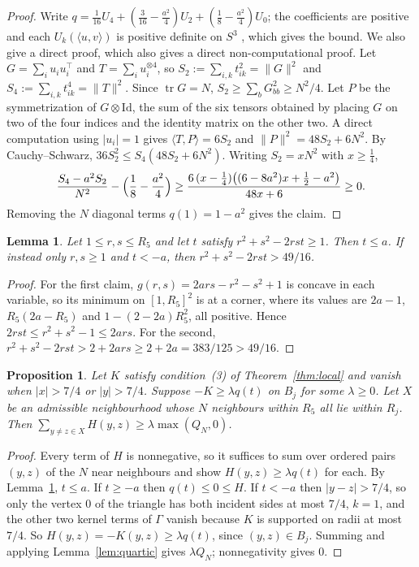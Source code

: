 \documentclass[11pt]{amsart}
\numberwithin{equation}{section}
\newtheorem{lemma}[theorem]{Lemma}
\newtheorem{proposition}[theorem]{Proposition}
\theoremstyle{remark}
\newcommand{\ip}[2]{\langle #1,#2\rangle}
\newcommand{\Gam}{\Gamma}
\begin{document}
\begin{proof}
Write $q=\frac1{16}U_4+(\frac3{16}-\frac{a^2}4)U_2+(\frac18-\frac{a^2}4)U_0$; the coefficients are positive and each $U_k(\ip uv)$ is positive definite on $S^3$ \cite{Schoenberg}, which gives the bound. We also give a direct proof, which also gives a direct non-computational proof. Let $G=\sum_iu_iu_i^\top$ and $T=\sum_iu_i^{\otimes4}$, so $S_2:=\sum_{i,k}t_{ik}^2=\|G\|^2$ and $S_4:=\sum_{i,k}t_{ik}^4=\|T\|^2$. Since $\operatorname{tr}G=N$, $S_2\ge\sum_bG_{bb}^2\ge N^2/4$. Let $P$ be the symmetrization of $G\otimes\mathrm{Id}$, the sum of the six tensors obtained by placing $G$ on two of the four indices and the identity matrix on the other two. A direct computation using $|u_i|=1$ gives $\ip TP=6S_2$ and $\|P\|^2=48S_2+6N^2$. By Cauchy--Schwarz, $36S_2^2\le S_4(48S_2+6N^2)$. Writing $S_2=xN^2$ with $x\ge\frac14$,
\[
\frac{S_4-a^2S_2}{N^2}-\Bigl(\frac18-\frac{a^2}4\Bigr)\ge\frac{6\,(x-\frac14)\bigl((6-8a^2)x+\frac12-a^2\bigr)}{48x+6}\ge0.
\]
Removing the $N$ diagonal terms $q(1)=1-a^2$ gives the claim.
\end{proof}

\begin{lemma}\label{lem:geom}
Let $1\le r,s\le R_5$ and let $t$ satisfy $r^2+s^2-2rst\ge1$. Then $t\le a$. If instead only $r,s\ge1$ and $t<-a$, then $r^2+s^2-2rst>49/16$.
\end{lemma}

\begin{proof}
For the first claim, $g(r,s)=2ars-r^2-s^2+1$ is concave in each variable, so its minimum on $[1,R_5]^2$ is at a corner, where its values are $2a-1$, $R_5(2a-R_5)$ and $1-(2-2a)R_5^2$, all positive. Hence $2rst\le r^2+s^2-1\le2ars$. For the second, $r^2+s^2-2rst>2+2ars\ge2+2a=383/125>49/16$.
\end{proof}

\begin{proposition}\label{prop:far}
Let $K$ satisfy condition~(3) of Theorem~\ref{thm:local} and vanish when $|x|>7/4$ or $|y|>7/4$. Suppose $-K\ge\lambda q(t)$ on $B_j$ for some $\lambda\ge0$. Let $X$ be an admissible neighbourhood whose $N$ neighbours within $R_5$ all lie within $R_j$. Then $\sum_{y\ne z\in X}H(y,z)\ge\lambda\max(Q_N,0)$.
\end{proposition}

\begin{proof}
Every term of $H$ is nonnegative, so it suffices to sum over ordered pairs $(y,z)$ of the $N$ near neighbours and show $H(y,z)\ge\lambda q(t)$ for each. By Lemma~\ref{lem:geom}, $t\le a$. If $t\ge-a$ then $q(t)\le0\le H$. If $t<-a$ then $|y-z|>7/4$, so only the vertex $0$ of the triangle has both incident sides at most $7/4$, $k=1$, and the other two kernel terms of $\Gam$ vanish because $K$ is supported on radii at most $7/4$. So $H(y,z)=-K(y,z)\ge\lambda q(t)$, since $(y,z)\in B_j$. Summing and applying Lemma~\ref{lem:quartic} gives $\lambda Q_N$; nonnegativity gives $0$.
\end{proof}
\end{document}
